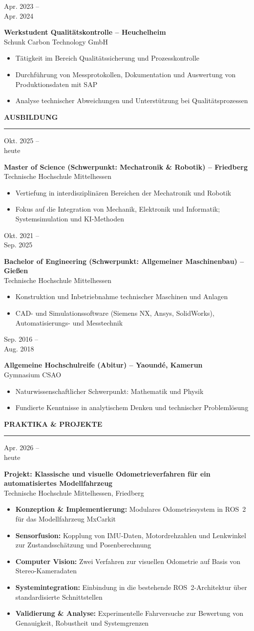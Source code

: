 \documentclass[11pt,a4paper]{article}
\newcommand{\sectionhead}[1]{%
  \vspace{1.1em}
  {\large\bfseries\color{accent}\MakeUppercase{#1}}\\[-0.35em]
  {\color{accent!50}\rule{\linewidth}{0.5pt}}\vspace{0.5em}}
\newcommand{\entry}[4]{%
  \noindent
  \begin{minipage}[t]{2.9cm}\raggedright\small\color{lightgray}#1\end{minipage}%
  \hspace{0.3cm}%
  \begin{minipage}[t]{\dimexpr\linewidth-3.2cm\relax}
    {\normalsize\bfseries\color{black!90}#2}\\[-0.1em]
    {\small\color{accent}#3}
    \begin{itemize}[leftmargin=1.1em,itemsep=0.1em,topsep=0.3em,parsep=0pt,label={\tiny$\bullet$}]
      \small #4
    \end{itemize}
  \end{minipage}\par\vspace{0.55em}}
\begin{document}
\entry{Apr. 2023 --\\ Apr. 2024}
{Werkstudent Qualitätskontrolle -- Heuchelheim}
{Schunk Carbon Technology GmbH}
{\item Tätigkeit im Bereich Qualitätssicherung und Prozesskontrolle
 \item Durchführung von Messprotokollen, Dokumentation und Auswertung von Produktionsdaten mit SAP
 \item Analyse technischer Abweichungen und Unterstützung bei Qualitätsprozessen}

\sectionhead{Ausbildung}

\entry{Okt. 2025 --\\ heute}
{Master of Science (Schwerpunkt: Mechatronik \& Robotik) -- Friedberg}
{Technische Hochschule Mittelhessen}
{\item Vertiefung in interdisziplinären Bereichen der Mechatronik und Robotik
 \item Fokus auf die Integration von Mechanik, Elektronik und Informatik; Systemsimulation und KI-Methoden}

\entry{Okt. 2021 --\\ Sep. 2025}
{Bachelor of Engineering (Schwerpunkt: Allgemeiner Maschinenbau) -- Gießen}
{Technische Hochschule Mittelhessen}
{\item Konstruktion und Inbetriebnahme technischer Maschinen und Anlagen
 \item CAD- und Simulationssoftware (Siemens NX, Ansys, SolidWorks), Automatisierungs- und Messtechnik}

\entry{Sep. 2016 --\\ Aug. 2018}
{Allgemeine Hochschulreife (Abitur) -- Yaoundé, Kamerun}
{Gymnasium CSAO}
{\item Naturwissenschaftlicher Schwerpunkt: Mathematik und Physik
 \item Fundierte Kenntnisse in analytischem Denken und technischer Problemlösung}

\sectionhead{Praktika \& Projekte}

\entry{Apr. 2026 --\\ heute}
{Projekt: Klassische und visuelle Odometrieverfahren für ein automatisiertes Modellfahrzeug}
{Technische Hochschule Mittelhessen, Friedberg}
{\item \textbf{Konzeption \& Implementierung:} Modulares Odometriesystem in ROS~2 für das Modellfahrzeug MxCarkit
 \item \textbf{Sensorfusion:} Kopplung von IMU-Daten, Motordrehzahlen und Lenkwinkel zur Zustandsschätzung und Posenberechnung
 \item \textbf{Computer Vision:} Zwei Verfahren zur visuellen Odometrie auf Basis von Stereo-Kameradaten
 \item \textbf{Systemintegration:} Einbindung in die bestehende ROS~2-Architektur über standardisierte Schnittstellen
 \item \textbf{Validierung \& Analyse:} Experimentelle Fahrversuche zur Bewertung von Genauigkeit, Robustheit und Systemgrenzen}
\end{document}
